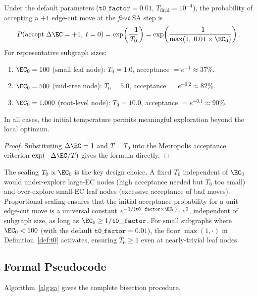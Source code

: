 \begin{proposition}
\label{prop:acceptance}
Under the default parameters ($\mathtt{t0\_factor} = 0.01$,
$T_{\mathrm{final}} = 10^{-4}$), the probability of accepting a
$+1$ edge-cut move at the \emph{first} SA step is
\[
  P(\text{accept}\; \Delta\EC = +1,\; t=0)
  = \exp\!\left(\frac{-1}{T_0}\right)
  = \exp\!\left(\frac{-1}{\max(1,\; 0.01 \times \EC_0)}\right).
\]
For representative subgraph sizes:
\begin{enumerate}
\item $\EC_0 = 100$ (small leaf node): $T_0 = 1.0$, acceptance $= e^{-1} \approx 37\%$.
\item $\EC_0 = 500$ (mid-tree node): $T_0 = 5.0$, acceptance $= e^{-0.2} \approx 82\%$.
\item $\EC_0 = 1{,}000$ (root-level node): $T_0 = 10.0$, acceptance $= e^{-0.1} \approx 90\%$.
\end{enumerate}
In all cases, the initial temperature permits meaningful exploration beyond
the \metis{} local optimum.
\end{proposition}

\begin{proof}
Substituting $\Delta\EC = 1$ and $T = T_0$ into the Metropolis acceptance
criterion $\exp(-\Delta\EC / T)$ gives the formula directly.
\end{proof}

\begin{remark}
The scaling $T_0 \propto \EC_0$ is the key design choice.
A fixed $T_0$ independent of $\EC_0$ would under-explore large-EC nodes
(high acceptance needed but $T_0$ too small) and over-explore small-EC
leaf nodes (excessive acceptance of bad moves).
Proportional scaling ensures that the initial acceptance probability for a
unit edge-cut move is a universal constant $e^{-1/(\mathtt{t0\_factor} \times \EC_0)} \cdot e^0$,
independent of subgraph size, as long as $\EC_0 \ge 1/\mathtt{t0\_factor}$.
For small subgraphs where $\EC_0 < 100$ (with the default $\mathtt{t0\_factor} = 0.01$),
the floor $\max(1, \cdot)$ in Definition~\ref{def:t0} activates, ensuring
$T_0 \ge 1$ even at nearly-trivial leaf nodes.
\end{remark}

\subsection{Formal Pseudocode}

Algorithm~\ref{alg:sa} gives the complete \sa{} bisection procedure.

